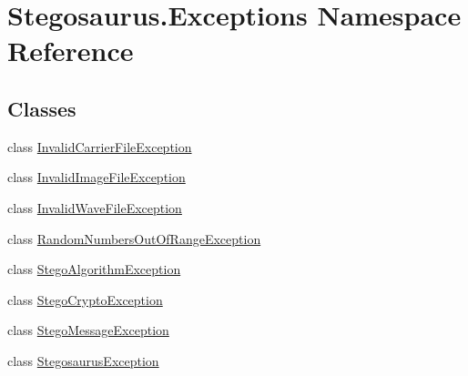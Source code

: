 \hypertarget{namespace_stegosaurus_1_1_exceptions}{}\section{Stegosaurus.\+Exceptions Namespace Reference}
\label{namespace_stegosaurus_1_1_exceptions}
\subsection*{Classes}
\begin{DoxyCompactItemize}
\item 
class \hyperlink{class_stegosaurus_1_1_exceptions_1_1_invalid_carrier_file_exception}{Invalid\+Carrier\+File\+Exception}
\item 
class \hyperlink{class_stegosaurus_1_1_exceptions_1_1_invalid_image_file_exception}{Invalid\+Image\+File\+Exception}
\item 
class \hyperlink{class_stegosaurus_1_1_exceptions_1_1_invalid_wave_file_exception}{Invalid\+Wave\+File\+Exception}
\item 
class \hyperlink{class_stegosaurus_1_1_exceptions_1_1_random_numbers_out_of_range_exception}{Random\+Numbers\+Out\+Of\+Range\+Exception}
\item 
class \hyperlink{class_stegosaurus_1_1_exceptions_1_1_stego_algorithm_exception}{Stego\+Algorithm\+Exception}
\item 
class \hyperlink{class_stegosaurus_1_1_exceptions_1_1_stego_crypto_exception}{Stego\+Crypto\+Exception}
\item 
class \hyperlink{class_stegosaurus_1_1_exceptions_1_1_stego_message_exception}{Stego\+Message\+Exception}
\item 
class \hyperlink{class_stegosaurus_1_1_exceptions_1_1_stegosaurus_exception}{Stegosaurus\+Exception}
\end{DoxyCompactItemize}
